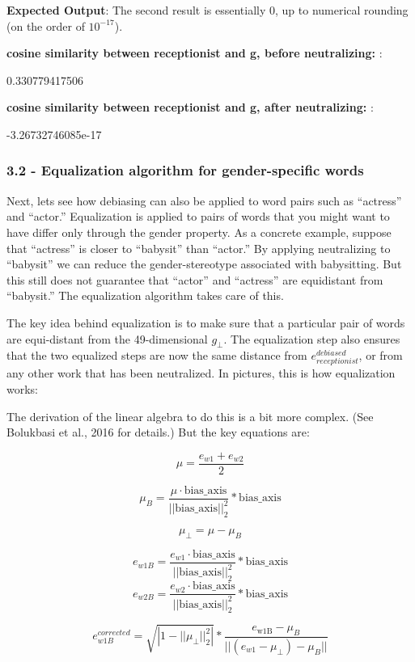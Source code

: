 \documentclass[11pt]{article}
\begin{document}
    \textbf{Expected Output}: The second result is essentially 0, up to
numerical rounding (on the order of $10^{-17}$).

\textbf{cosine similarity between receptionist and g, before
neutralizing:} :

0.330779417506

\textbf{cosine similarity between receptionist and g, after
neutralizing:} :

-3.26732746085e-17

    \subsubsection{3.2 - Equalization algorithm for gender-specific
words}\label{equalization-algorithm-for-gender-specific-words}

Next, lets see how debiasing can also be applied to word pairs such as
``actress'' and ``actor.'' Equalization is applied to pairs of words
that you might want to have differ only through the gender property. As
a concrete example, suppose that ``actress'' is closer to ``babysit''
than ``actor.'' By applying neutralizing to ``babysit'' we can reduce
the gender-stereotype associated with babysitting. But this still does
not guarantee that ``actor'' and ``actress'' are equidistant from
``babysit.'' The equalization algorithm takes care of this.

The key idea behind equalization is to make sure that a particular pair
of words are equi-distant from the 49-dimensional $g_\perp$. The
equalization step also ensures that the two equalized steps are now the
same distance from $e_{receptionist}^{debiased}$, or from any other work
that has been neutralized. In pictures, this is how equalization works:

The derivation of the linear algebra to do this is a bit more complex.
(See Bolukbasi et al., 2016 for details.) But the key equations are:

\[ \mu = \frac{e_{w1} + e_{w2}}{2}\tag{4}\]

\[ \mu_{B} = \frac {\mu \cdot \text{bias_axis}}{||\text{bias_axis}||_2^2} *\text{bias_axis}
\tag{5}\]

\[\mu_{\perp} = \mu - \mu_{B} \tag{6}\]

\[ e_{w1B} = \frac {e_{w1} \cdot \text{bias_axis}}{||\text{bias_axis}||_2^2} *\text{bias_axis}
\tag{7}\]
\[ e_{w2B} = \frac {e_{w2} \cdot \text{bias_axis}}{||\text{bias_axis}||_2^2} *\text{bias_axis}
\tag{8}\]

\[e_{w1B}^{corrected} = \sqrt{ |{1 - ||\mu_{\perp} ||^2_2} |} * \frac{e_{\text{w1B}} - \mu_B} {||(e_{w1} - \mu_{\perp}) - \mu_B||} \tag{9}\]
\end{document}
